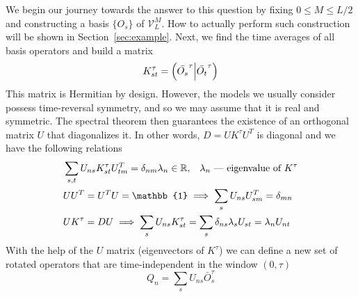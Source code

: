 We begin our journey towards the answer to this question by fixing \(0\leq M \leq L/2\) and constructing a basis \(\{O_s\}\) of \(\mathcal{V}_L^M\). How to actually perform such construction
will be shown in Section~\ref{sec:example}. Next, we find the time averages of all basis operators and build a matrix
\begin{equation}
  K^{\tau}_{st} = \left(\bar{O_s}^{\tau} \middle| \bar{O_t}^{\tau}\right)
  \label{eq:stiffness matrix}
\end{equation}
This matrix is Hermitian by design. However, the models we usually
consider possess time-reversal symmetry, and so we may assume that it is real and symmetric.
The spectral theorem then guarantees the existence of an orthogonal matrix \(U\) that
diagonalizes it. In other words, \(D = UK^{\tau}U^{T}\) is diagonal and we have the following relations
\begin{align}
  &\sum_{s, t} U_{n s} K_{s t}^{\tau} U_{t m}^{T}=\delta_{nm} \lambda_{n} \in
   \RR,\;\;\; \lambda_n \text{ --- eigenvalue of }K^{\tau} \label{eq:property diag} \\
  &UU^{T} = U^{T}U = \mathbb{1} \implies \sum_{s} U_{ns}U_{sm}^{T} =
   \delta_{mn} \label{eq:propery ortho}\\
  & U K^{\tau} = D U \implies \sum_s U_{ns} K_{st}^{\tau} = \sum_s  \delta_{ns} \lambda_s U_{st} = \lambda_n U_{nt}\label{eq:property}
\end{align} 
With the help of the \(U\) matrix (eigenvectors of \(K^{\tau}\)) we can define a new set of rotated operators that
are time-independent in the window \(\left(0,\tau\right)\)
\begin{equation}
  Q_n = \sum_s U_{ns}\bar{O}_{s}^{\tau}\label{eq:new operators}
\end{equation} 


